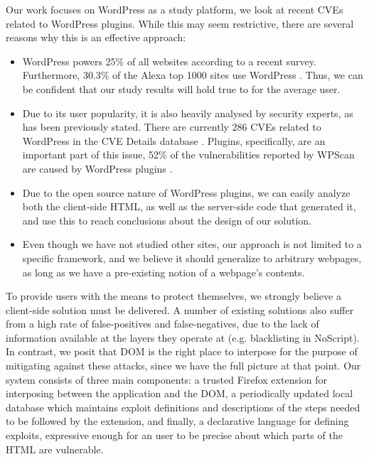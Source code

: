 Our work focuses on WordPress as a study platform, we look at recent CVEs related to WordPress plugins. While this may seem restrictive, there are several reasons why this is an effective approach:
\begin{itemize}
	\item WordPress powers 25\% of all websites according to a recent survey. Furthermore, 30.3\% of the Alexa top 1000 sites use WordPress \cite{w3techs}. Thus, we can be confident that our study results will hold true to for the average user.
	\item Due to its user popularity, it is also heavily analysed by security experts, as has been previously stated. There are currently 286 CVEs related to WordPress in the CVE Details database \cite{cvedetails}. Plugins, specifically, are an important part of this issue, 52\% of the vulnerabilities reported by WPScan are caused by WordPress plugins \cite{wpscan}.
	\item Due to the open source nature of WordPress plugins, we can easily analyze both the client-side HTML, as well as the server-side code that generated it, and use this to reach conclusions about the design of our solution.
	\item Even though we have not studied other sites, our approach is not limited to a specific framework, and we believe it should generalize to arbitrary webpages, as long as we have a pre-existing notion of a webpage's contents.
	
\end{itemize}

To provide users with the means to protect themselves, we strongly believe a client-side solution must be delivered. A number of existing solutions also suffer from a high rate of false-positives and false-negatives, due to the lack of information available at the layers they operate at (e.g. blacklisting in NoScript). In contrast, we posit that DOM is the right place to interpose for the purpose of mitigating against these attacks, since we have the full picture at that point. Our system consists of three main components: a trusted Firefox extension for interposing between the application and the DOM, a periodically updated local database which maintains exploit definitions and descriptions of the steps needed to be followed by the extension, and finally, a declarative language for defining exploits, expressive enough for an user to be precise about which parts of the HTML are vulnerable. 


